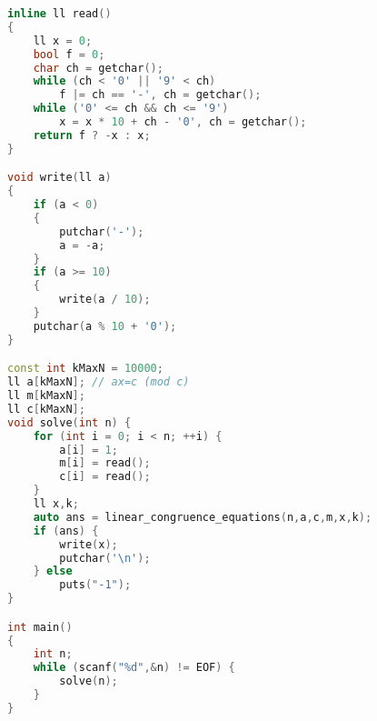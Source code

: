 \begin{lstlisting}[language={c++}]
inline ll read()
{
	ll x = 0;
	bool f = 0;
	char ch = getchar();
	while (ch < '0' || '9' < ch)
		f |= ch == '-', ch = getchar();
	while ('0' <= ch && ch <= '9')
		x = x * 10 + ch - '0', ch = getchar();
	return f ? -x : x;
}

void write(ll a)
{
	if (a < 0)
	{
		putchar('-');
		a = -a;
	}
	if (a >= 10)
	{
		write(a / 10);
	}
	putchar(a % 10 + '0');
}

const int kMaxN = 10000;
ll a[kMaxN]; // ax=c (mod c)
ll m[kMaxN];
ll c[kMaxN]; 
void solve(int n) {
	for (int i = 0; i < n; ++i) {
		a[i] = 1;
		m[i] = read();
		c[i] = read();
	}
	ll x,k;
	auto ans = linear_congruence_equations(n,a,c,m,x,k);
	if (ans) {
		write(x);
		putchar('\n');
	} else
		puts("-1");
}

int main()
{
	int n;
	while (scanf("%d",&n) != EOF) {
		solve(n);
	}
}
		\end{lstlisting}